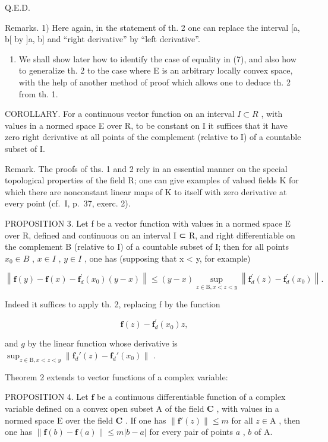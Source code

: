 Q.E.D.

Remarks. 1) Here again, in the statement of th. 2 one can replace the interval {[}a, b{[} by {]}a, b{]} and ``right derivative'' by ``left derivative''.

\begin{enumerate}
\def\labelenumi{\arabic{enumi})}
\setcounter{enumi}{1}
\tightlist
\item
  We shall show later how to identify the case of equality in (7), and also how to generalize th. 2 to the case where E is an arbitrary locally convex space, with the help of another method of proof which allows one to deduce th. 2 from th. 1.
\end{enumerate}

COROLLARY. For a continuous vector function on an interval \(I \subset R\) , with values in a normed space E over R, to be constant on I it suffices that it have zero right derivative at all points of the complement (relative to I) of a countable subset of I.

Remark. The proofs of ths. 1 and 2 rely in an essential manner on the special topological properties of the field R; one can give examples of valued fields K for which there are nonconstant linear maps of K to itself with zero derivative at every point (cf.~I, p.~37, exerc. 2).

PROPOSITION 3. Let f be a vector function with values in a normed space E over R, defined and continuous on an interval I ⊂ R, and right differentiable on the complement B (relative to I) of a countable subset of I; then for all points \(x_{0} \in B\) , \(x \in I\) , \(y \in I\) , one has (supposing that x \textless{} y, for example)

\[
\left\| \mathbf {f} (y) - \mathbf {f} (x) - \mathbf {f} _ {d} ^ {\prime} (x _ {0}) (y - x) \right\| \leqslant (y - x) \sup _ {z \in \mathrm{B}, x <   z <   y} \left\| \mathbf {f} _ {d} ^ {\prime} (z) - \mathbf {f} _ {d} ^ {\prime} (x _ {0}) \right\|.\tag{9}
\]

Indeed it suffices to apply th. 2, replacing f by the function

\[
\mathbf {f} (z) - \mathbf {f} _ {d} ^ {\prime} (x _ {0}) z,
\]

and \(g\) by the linear function whose derivative is \(\sup_{z\in \mathrm{B}, x < z < y}\left\| \mathbf{f}_d'(z) - \mathbf{f}_d'(x_0)\right\|\) .

Theorem 2 extends to vector functions of a complex variable:

PROPOSITION 4. Let \(\mathbf{f}\) be a continuous differentiable function of a complex variable defined on a convex open subset A of the field \(\mathbf{C}\) , with values in a normed space E over the field \(\mathbf{C}\) . If one has \(\| \mathbf{f}'(z)\| \leqslant m\) for all \(z\in \mathrm{A}\) , then one has \(\| \mathbf{f}(b) - \mathbf{f}(a)\| \leqslant m|b - a|\) for every pair of points \(a\) , \(b\) of A.


